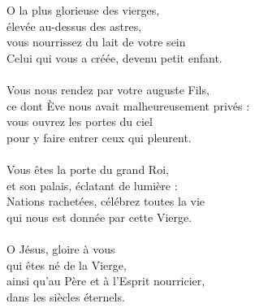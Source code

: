 O la plus glorieuse des vierges,\\
élevée au-dessus des astres,\\
vous nourrissez du lait de votre sein\\
Celui qui vous a créée, devenu petit enfant.\\
\\
Vous nous rendez par votre auguste Fils,\\
ce dont Ève nous avait malheureusement privés :\\
vous ouvrez les portes du ciel\\
pour y faire entrer ceux qui pleurent.\\
\\
Vous êtes la porte du grand Roi,\\
et son palais, éclatant de lumière :\\
Nations rachetées, célébrez toutes la vie\\
qui nous est donnée par cette Vierge.\\
\\
O Jésus, gloire à vous\\
qui êtes né de la Vierge,\\
ainsi qu’au Père et à l’Esprit nourricier,\\
dans les siècles éternels.